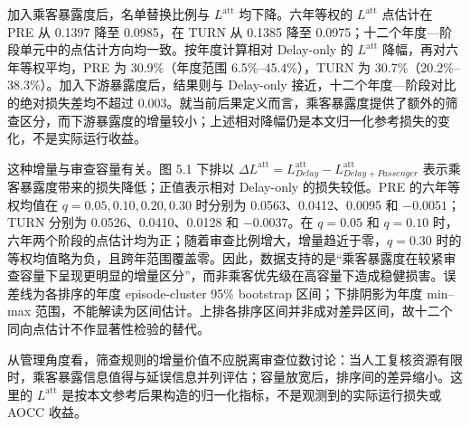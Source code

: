 \documentclass[UTF8,a4paper,11pt]{ctexart}
\numberwithin{table}{section}
\numberwithin{figure}{section}
\begin{document}
加入乘客暴露度后，名单替换比例与 $L^{\mathrm{att}}$ 均下降。六年等权的 $L^{\mathrm{att}}$ 点估计在 PRE 从 0.1397 降至 0.0985，在 TURN 从 0.1385 降至 0.0975；十二个年度—阶段单元中的点估计方向均一致。按年度计算相对 Delay-only 的 $L^{\mathrm{att}}$ 降幅，再对六年等权平均，PRE 为 30.9\%（年度范围 6.5\%–45.4\%），TURN 为 30.7\%（20.2\%–38.3\%）。加入下游暴露度后，结果则与 Delay-only 接近，十二个年度—阶段对比的绝对损失差均不超过 0.003。就当前后果定义而言，乘客暴露度提供了额外的筛查区分，而下游暴露度的增量较小；上述相对降幅仍是本文归一化参考损失的变化，不是实际运行收益。

这种增量与审查容量有关。图 5.1 下排以 $\Delta L^{\mathrm{att}}=L^{\mathrm{att}}_{Delay}-L^{\mathrm{att}}_{Delay+Passenger}$ 表示乘客暴露度带来的损失降低；正值表示相对 Delay-only 的损失较低。PRE 的六年等权均值在 $q=0.05, 0.10, 0.20, 0.30$ 时分别为 0.0563、0.0412、0.0095 和 $-0.0051$；TURN 分别为 0.0526、0.0410、0.0128 和 $-0.0037$。在 $q=0.05$ 和 $q=0.10$ 时，六年两个阶段的点估计均为正；随着审查比例增大，增量趋近于零，$q=0.30$ 时的等权均值略为负，且跨年范围覆盖零。因此，数据支持的是“乘客暴露度在较紧审查容量下呈现更明显的增量区分”，而非乘客优先级在高容量下造成稳健损害。误差线为各排序的年度 episode-cluster 95\% bootstrap 区间；下排阴影为年度 min–max 范围，不能解读为区间估计。上排各排序区间并非成对差异区间，故十二个同向点估计不作显著性检验的替代。

从管理角度看，筛查规则的增量价值不应脱离审查位数讨论：当人工复核资源有限时，乘客暴露信息值得与延误信息并列评估；容量放宽后，排序间的差异缩小。这里的 $L^{\mathrm{att}}$ 是按本文参考后果构造的归一化指标，不是观测到的实际运行损失或 AOCC 收益。
\end{document}
